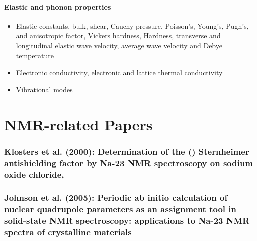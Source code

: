 \documentclass[10pt,a4paper, titlepage]{article}
\begin{document}
\subsection{Elastic and phonon properties}

\begin{itemize}
  \item Elastic constants, bulk, shear, Cauchy pressure, Poisson's, Young's, Pugh's, and anisotropic factor, Vickers hardness, Hardness, transverse and longitudinal elastic wave velocity, average wave velocity and Debye temperature 
  \item Electronic conductivity, electronic and lattice thermal conductivity
  \item Vibrational modes
\end{itemize}

\part{NMR-related Papers}

\section{Klosters et al. (2000): Determination of the () Sternheimer antishielding factor by Na-23 NMR spectroscopy on sodium oxide chloride, }

\section{Johnson et al. (2005): Periodic ab initio calculation of nuclear quadrupole parameters as an assignment tool in solid-state NMR spectroscopy: applications to Na-23 NMR spectra of crystalline materials}
\end{document}
